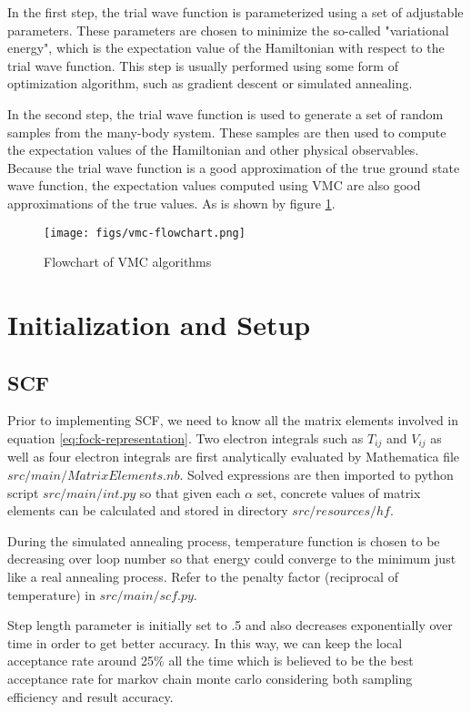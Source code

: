 \documentclass[11pt]{article}
\begin{document}
In the first step, the trial wave function is parameterized using a set of adjustable parameters. These parameters are chosen to minimize the so-called "variational energy", which is the expectation value of the Hamiltonian with respect to the trial wave function. This step is usually performed using some form of optimization algorithm, such as gradient descent or simulated annealing.

In the second step, the trial wave function is used to generate a set of random samples from the many-body system. These samples are then used to compute the expectation values of the Hamiltonian and other physical observables. Because the trial wave function is a good approximation of the true ground state wave function, the expectation values computed using VMC are also good approximations of the true values. As is shown by figure \ref{fig:vmc flowchart}.

\begin{figure}
    \centering
    \texttt{[image: figs/vmc-flowchart.png]}
    \caption{Flowchart of VMC algorithms}
    \label{fig:vmc flowchart}%
\end{figure}

\section{Initialization and Setup}

\subsection{SCF}
Prior to implementing SCF, we need to know all the matrix elements involved in equation \ref{eq:fock-representation}. Two electron integrals such as $T_{ij}$ and $V_{ij}$ as well as four electron integrals are first analytically evaluated by Mathematica file $src/main/MatrixElements.nb$. Solved expressions are then imported to python script $src/main/int.py$ so that given each $\alpha$ set, concrete values of matrix elements can be calculated and stored in directory $src/resources/hf$. 

During the simulated annealing process, temperature function is chosen to be decreasing over loop number so that energy could converge to the minimum just like a real annealing process. Refer to the penalty factor (reciprocal of temperature) in $src/main/scf.py$. 

Step length parameter is initially set to .5 and also decreases exponentially over time in order to get better accuracy. In this way, we can keep the local acceptance rate around 25\% all the time which is believed \cite{optimal-mc-acc-rate} to be the best acceptance rate for markov chain monte carlo considering both sampling efficiency and result accuracy.
\end{document}
